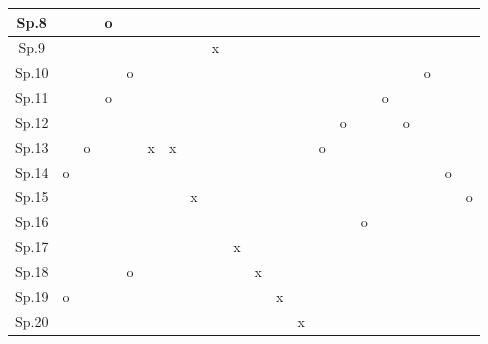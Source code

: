 \documentclass[11pt,a4j]{jreport}
\begin{document}
\begin{table}[H]
\begin{tabular}[H]{|c||cccc|cccc|cccc|cccc|cccc|}
        Sp.8 &  &  & o&  &    &  &  &  &   &  &  &  &   &  &  &  &   &  &  & \\ \hline
        Sp.9 &  &  &  &  &    &  &  & x&   &  &  &  &   &  &  &  &   &  &  & \\
        Sp.10 & &  &  & o&    &  &  &  &   &  &  &  &   &  &  &  &   & o&  & \\
        Sp.11 & &  & o&  &    &  &  &  &   &  &  &  &   &  &  & o&   &  &  & \\
        Sp.12 & &  &  &  &    &  &  &  &   &  &  &  &   & o&  &  &  o&  &  & \\
        Sp.13 & & o&  &  &   x& x&  &  &   &  &  &  &  o&  &  &  &   &  &  & \\
        Sp.14 & o& &  &  &    &  &  &  &   &  &  &  &   &  &  &  &   &  & o& \\
        Sp.15 & &  &  &  &    &  & x&  &   &  &  &  &   &  &  &  &   &  &  & o\\
        Sp.16 & &  &  &  &    &  &  &  &   &  &  &  &   &  & o&  &   &  &  & \\ \hline
        Sp.17 & &  &  &  &    &  &  &  &   x& &  &  &   &  &  &  &   &  &  & \\
        Sp.18 & &  &  & o&    &  &  &  &   & x&  &  &   &  &  &  &   &  &  & \\
        Sp.19 &o&  &  &  &    &  &  &  &   &  & x&  &   &  &  &  &   &  &  & \\
        Sp.20 & &  &  &  &    &  &  &  &   &  &  & x&   &  &  &  &   &  &  & \\ \hline
        
      \end{tabular}
    \end{table}
\end{document}
